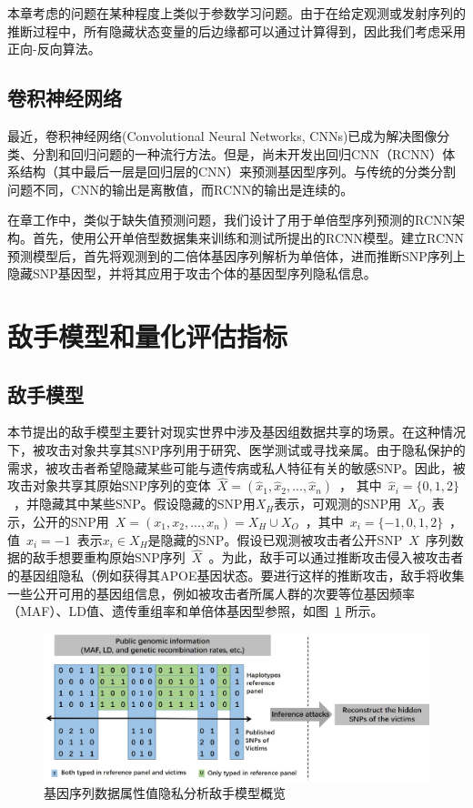 本章考虑的问题在某种程度上类似于参数学习问题。由于在给定观测或发射序列的推断过程中，所有隐藏状态变量的后边缘都可以通过计算得到，因此我们考虑采用正向-反向算法。

\subsection{卷积神经网络}

最近，卷积神经网络(Convolutional Neural Networks, CNNs)\cite{long2017fully,scutti2018what}已成为解决图像分类、分割和回归问题的一种流行方法。但是，尚未开发出回归CNN（RCNN）体系结构（其中最后一层是回归层的CNN）来预测基因型序列。与传统的分类分割问题不同，CNN的输出是离散值\cite{scutti2018what}，而RCNN的输出是连续的。

在章工作中，类似于缺失值预测问题，我们设计了用于单倍型序列预测的RCNN架构。首先，使用公开单倍型数据集来训练和测试所提出的RCNN模型。建立RCNN预测模型后，首先将观测到的二倍体基因序列解析为单倍体，进而推断SNP序列上隐藏SNP基因型，并将其应用于攻击个体的基因型序列隐私信息。


\section{敌手模型和量化评估指标}\label{sec:adver}

\subsection{敌手模型}

本节提出的敌手模型主要针对现实世界中涉及基因组数据共享的场景。在这种情况下，被攻击对象共享其SNP序列用于研究、医学测试或寻找亲属。由于隐私保护的需求，被攻击者希望隐藏某些可能与遗传病或私人特征有关的敏感SNP。因此，被攻击对象共享其原始SNP序列的变体~$\hat{X}=(\hat{x}_1,\hat{x}_2, ... , \hat{x}_n)$~， 其中~$\hat{x}_i =\{0,1,2\}$~，并隐藏其中某些SNP。假设隐藏的SNP用$X_H$表示，可观测的SNP用~$X_O$~表示，公开的SNP用~$X=(x_1, x_2, ..., x_n)=X_H \cup X_O$~，其中~$x_i =\{-1,0,1,2\}$~，值~$x_i=-1$~表示$x_i\in X_H$是隐藏的SNP。假设已观测被攻击者公开SNP~$X$~序列数据的敌手想要重构原始SNP序列~$\hat{X}$~。为此，敌手可以通过推断攻击侵入被攻击者的基因组隐私（例如获得其APOE基因状态\cite{nyholt2009jim}。要进行这样的推断攻击，敌手将收集一些公开可用的基因组信息\cite{IGSR2019,howie2014impute2}，例如被攻击者所属人群的次要等位基因频率（MAF）、LD值、遗传重组率和单倍体基因型参照，如图~\ref{fig:adversary-model} 所示。

\begin{figure}[htbp]
	\centering
	\includegraphics[width = 0.95\linewidth]{./figures/Fig2-adversary-model.eps}
	\caption{基因序列数据属性值隐私分析敌手模型概览}
	\label{fig:adversary-model}
\end{figure}

